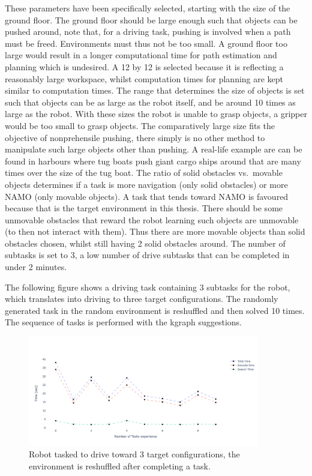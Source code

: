 These parameters have been specifically selected, starting with the size of the ground floor. The ground floor should be large enough such that objects can be pushed around, note that, for a driving task, pushing is involved when a path must be freed. Environments must thus not be too small. A ground floor too large would result in a longer computational time for path estimation and planning which is undesired. A 12 by 12 is selected because it is reflecting a reasonably large workspace, whilst computation times for planning are kept similar to computation times. The range that determines the size of objects is set such that objects can be as large as the robot itself, and be around 10 times as large as the robot. With these sizes the robot is unable to grasp objects, a gripper would be too small to grasp objects. The comparatively large size fits the objective of nonprehensile pushing, there simply is no other method to manipulate such large objects other than pushing. A real-life example are can be found in harbours where tug boats push giant cargo ships around that are many times over the size of the tug boat. The ratio of solid obstacles vs.~movable objects determines if a task is more navigation (only solid obstacles) or more \ac{NAMO} (only movable objects). A task that tends toward \ac{NAMO} is favoured because that is the target environment in this thesis. There should be some unmovable obstacles that reward the robot learning such objects are unmovable (to then not interact with them). Thus there are more movable objects than solid obstacles chosen, whilst still having 2 solid obstacles around. The number of subtasks is set to 3, a low number of drive subtasks that can be completed in under 2 minutes.\bs

The following figure shows a driving task containing 3 subtasks for the robot, which translates into driving to three target configurations. The randomly generated task in the random environment is reshuffled and then solved 10 times. The sequence of tasks is performed with the \ac{kgraph} suggestions. 

\begin{figure}[H]
    \centering
    \includegraphics[width=0.9\textwidth]{figures/results/random_drive_execution_times}
    \caption{Robot tasked to drive toward 3 target configurations, the environment is reshuffled after completing a task.}%
    \label{fig:rand_drive_times}
\end{figure}

